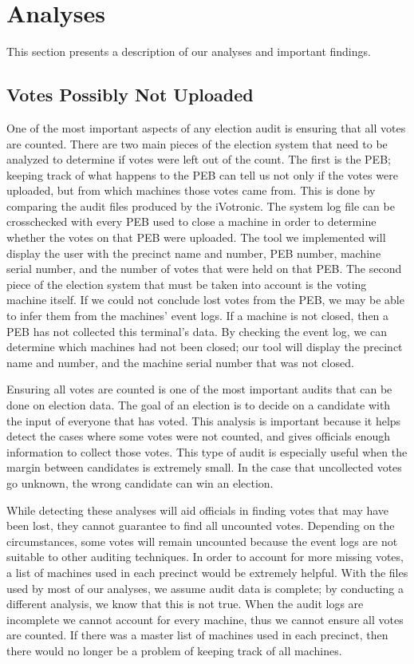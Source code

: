 \section{Analyses}
This section presents a description of our analyses and important findings.
\subsection{Votes Possibly Not Uploaded}
One of the most important aspects of any election audit is ensuring that all votes are counted.  There are two main pieces of the election system that need to be analyzed to determine if votes were left out of the count.  The first is the PEB; keeping track of what happens to the PEB can tell us not only if the votes were uploaded, but from which machines those votes came from.  This is done by comparing the audit files produced by the iVotronic.  The system log file can be crosschecked with every PEB used to close a machine in order to determine whether the votes on that PEB were uploaded.  The tool we implemented will display the user with the precinct name and number, PEB number, machine serial number, and the number of votes that were held on that PEB.  The second piece of the election system that must be taken into account is the voting machine itself.  If we could not conclude lost votes from the PEB, we may be able to infer them from the machines' event logs.  If a machine is not closed, then a PEB has not collected this terminal's data.  By checking the event log, we can determine which machines had not been closed; our tool will display the precinct name and number, and the machine serial number that was not closed. 

Ensuring all votes are counted is one of the most important audits that can be done on election data.  The goal of an election is to decide on a candidate with the input of everyone that has voted.  This analysis is important because it helps detect the cases where some votes were not counted, and gives officials enough information to collect those votes.  This type of audit is especially useful when the margin between candidates is extremely small.  In the case that uncollected votes go unknown, the wrong candidate can win an election.  

While detecting these analyses will aid officials in finding votes that may have been lost, they cannot guarantee to find all uncounted votes.  Depending on the circumstances, some votes will remain uncounted because the event logs are not suitable to other auditing techniques.  In order to account for more missing votes, a list of machines used in each precinct would be extremely helpful.  With the files used by most of our analyses, we assume audit data is complete; by conducting a different analysis, we know that this is not true.  When the audit logs are incomplete we cannot account for every machine, thus we cannot ensure all votes are counted.  If there was a master list of machines used in each precinct, then there would no longer be a problem of keeping track of all machines.  
 
